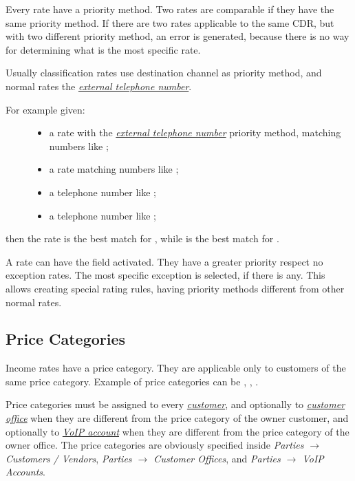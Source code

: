 \documentclass[letterpaper,10pt,english]{sphinxmanual}
\begin{document}
Every rate have a priority method. Two rates are comparable if they have the same priority method. If there are two rates applicable to the same CDR, but with two different priority method, an error is generated, because there is no way for determining what is the most specific rate.

Usually classification rates use destination channel as priority method, and normal rates the {\hyperref[index:term-external-telephone-number]{\emph{external telephone number}}}.
\begin{description}
\item[{For example given:}] \leavevmode\begin{itemize}
\item {} 
a rate  with the {\hyperref[index:term-external-telephone-number]{\emph{external telephone number}}} priority method, matching numbers like ;

\item {} 
a rate  matching numbers like ;

\item {} 
a telephone number  like ;

\item {} 
a telephone number  like ;

\end{itemize}

\end{description}

then the rate  is the best match for , while  is the best match for .

A rate can have the  field activated. They have a greater priority respect no exception rates. The most specific exception is selected, if there is any. This allows creating special rating rules, having priority methods different from other normal rates.


\subsection{Price Categories}
\label{index:price-categories}
Income rates have a price category. They are applicable only to customers of the same price category. Example of price categories can be , , .

Price categories must be assigned to every {\hyperref[index:term-customer]{\emph{customer}}}, and optionally to {\hyperref[index:term-customer-office]{\emph{customer office}}} when they are different from the price category of the owner customer, and optionally to {\hyperref[index:term-voip-account]{\emph{VoIP account}}} when they are different from the price category of the owner office. The price categories are obviously specified inside \emph{Parties \(\rightarrow\) Customers / Vendors}, \emph{Parties \(\rightarrow\) Customer Offices}, and \emph{Parties \(\rightarrow\) VoIP Accounts}.
\end{document}
